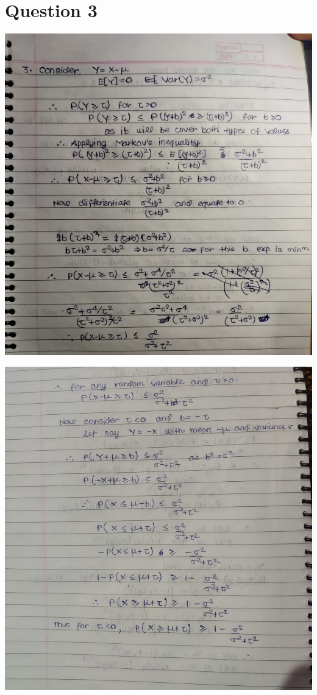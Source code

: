 \documentclass{article}
\theoremstyle{remark}
\begin{document}
\section{Question 3}
\includegraphics[width=\textwidth, height=\textheight, keepaspectratio]{3a.jpeg} \par
\includegraphics[width=\textwidth, height=\textheight, keepaspectratio]{3b.jpeg}\par
\end{document}
